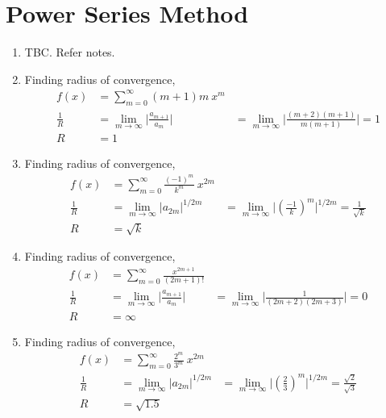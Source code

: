 \section{Power Series Method}

\begin{enumerate}
    \item TBC. Refer notes.
    \item Finding radius of convergence,
          \begin{align}
              f(x)                           & = \sum_{m = 0}^{\infty} (m+1)m\ x^{m} \\
              \frac{1}{R}                    & = \lim_{m \to \infty}
              \Big| \frac{a_{m+1}}{a_m}\Big| & = \lim_{m \to \infty}
              \Big|\frac{(m+2)(m+1)}{m(m+1)}\Big| = 1                                \\
              R                              & = 1
          \end{align}

    \item Finding radius of convergence,
          \begin{align}
              f(x)            & = \sum_{m = 0}^{\infty}
              \frac{(-1)^m}{k^m}\ x^{2m}                \\
              \frac{1}{R}     & = \lim_{m \to \infty}
              |a_{2m}|^{1/2m} & = \lim_{m \to \infty}
              \Bigg|\left( \frac{-1}{k} \right)^{m}\Bigg|^{1/2m}
              = \frac{1}{\sqrt{k}}                      \\
              R               & = \sqrt{k}
          \end{align}

    \item Finding radius of convergence,
          \begin{align}
              f(x)        & = \sum_{m = 0}^{\infty}
              \frac{x^{2m + 1}}{(2m + 1)!}             \\
              \frac{1}{R} & = \lim_{m \to \infty}
              \Bigg| \frac{a_{m+1}}{a_m} \Bigg|
                          & = \lim_{m \to \infty}
              \Bigg| \frac{1}{(2m+2)(2m+3)} \Bigg| = 0 \\
              R           & = \infty
          \end{align}

    \item Finding radius of convergence,
          \begin{align}
              f(x)            & = \sum_{m = 0}^{\infty}
              \frac{2^m}{3^m}\ x^{2m}                   \\
              \frac{1}{R}     & = \lim_{m \to \infty}
              |a_{2m}|^{1/2m} & = \lim_{m \to \infty}
              \Bigg|\left( \frac{2}{3} \right)^{m}\Bigg|^{1/2m}
              = \frac{\sqrt{2}}{\sqrt{3}}               \\
              R               & = \sqrt{1.5}
          \end{align}


\end{enumerate}

